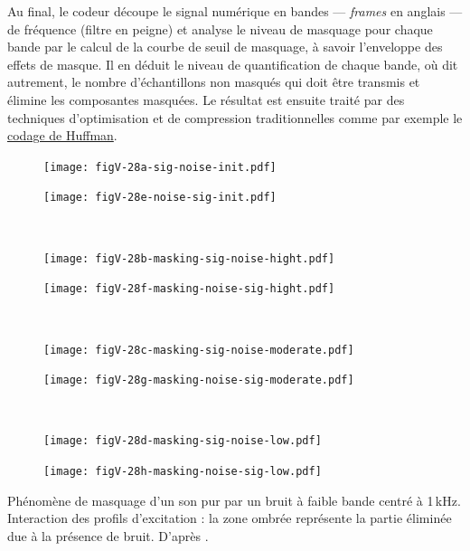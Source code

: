 Au final, le codeur découpe le signal numérique en bandes --- \textit{frames} en anglais --- de fréquence (filtre en peigne) et analyse le niveau de masquage pour chaque bande par le calcul de la courbe de seuil de masquage, à savoir l'enveloppe des effets de masque. Il en déduit le niveau de quantification de chaque bande, où dit autrement, le nombre d'échantillons non masqués qui doit être transmis et élimine les composantes masquées. Le résultat est ensuite traité par des techniques d'optimisation et de compression traditionnelles comme par exemple le \href{https://fr.wikipedia.org/wiki/Codage_de_Huffman}{codage de Huffman}.

%
\vspace{6pt}
\begin{jazzfigure}
\begin{subfigure}{\marginparwidth}
\texttt{[image: figV-28a-sig-noise-init.pdf]}
\end{subfigure}\hfill
\begin{subfigure}{\marginparwidth}
\texttt{[image: figV-28e-noise-sig-init.pdf]}
\end{subfigure}\\[2pt]
\begin{subfigure}{\marginparwidth}
\texttt{[image: figV-28b-masking-sig-noise-hight.pdf]}
\end{subfigure}\hfill
\begin{subfigure}{\marginparwidth}
\texttt{[image: figV-28f-masking-noise-sig-hight.pdf]}
\end{subfigure}\\[2pt]
\begin{subfigure}{\marginparwidth}
\texttt{[image: figV-28c-masking-sig-noise-moderate.pdf]}
\end{subfigure}\hfill
\begin{subfigure}{\marginparwidth}
\texttt{[image: figV-28g-masking-noise-sig-moderate.pdf]}
\end{subfigure}\\[2pt]
\begin{subfigure}{\marginparwidth}
\texttt{[image: figV-28d-masking-sig-noise-low.pdf]}
\end{subfigure}\hfill
\begin{subfigure}{\marginparwidth}
\texttt{[image: figV-28h-masking-noise-sig-low.pdf]}%
\end{subfigure}
\caption{\label{fig:V.28}Phénomène de masquage d'un son pur par un bruit à faible bande centré à 1\,kHz. Interaction des profils d'excitation : la zone ombrée représente la partie éliminée due à la présence de bruit. D'après \parencite{Botte-etal:1989}.}
\end{jazzfigure}
\vspace{4pt}

